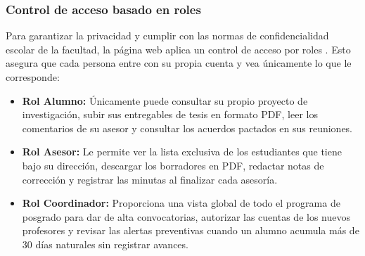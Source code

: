 \subsubsection{Control de acceso basado en roles}
Para garantizar la privacidad y cumplir con las normas de confidencialidad escolar de la facultad, la página web aplica un control de acceso por roles \parencite{ferraiolo2007}. Esto asegura que cada persona entre con su propia cuenta y vea únicamente lo que le corresponde:
\begin{itemize}
    \item \textbf{Rol Alumno:} Únicamente puede consultar su propio proyecto de investigación, subir sus entregables de tesis en formato PDF, leer los comentarios de su asesor y consultar los acuerdos pactados en sus reuniones.
    \item \textbf{Rol Asesor:} Le permite ver la lista exclusiva de los estudiantes que tiene bajo su dirección, descargar los borradores en PDF, redactar notas de corrección y registrar las minutas al finalizar cada asesoría.
    \item \textbf{Rol Coordinador:} Proporciona una vista global de todo el programa de posgrado para dar de alta convocatorias, autorizar las cuentas de los nuevos profesores y revisar las alertas preventivas cuando un alumno acumula más de 30 días naturales sin registrar avances.
\end{itemize}